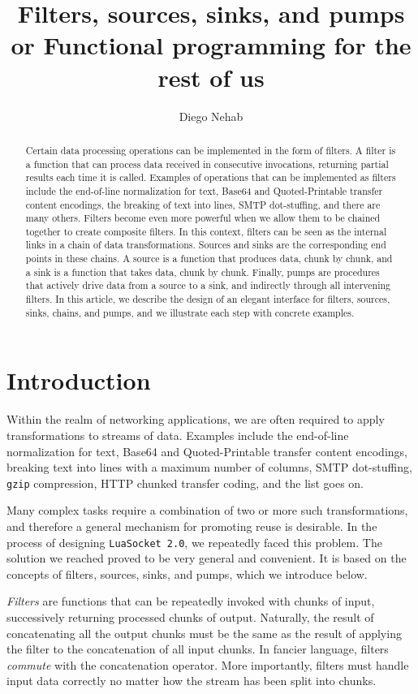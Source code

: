 \documentclass[10pt]{article}
\title{Filters, sources, sinks, and pumps\\
      {\large or Functional programming for the rest of us}}
\author{Diego Nehab}
\begin{document}
\maketitle

\begin{abstract}
Certain data processing operations can be implemented in the
form of filters. A filter is a function that can process
data received in consecutive invocations, returning partial
results each time it is called.  Examples of operations that
can be implemented as filters include the end-of-line
normalization for text, Base64 and Quoted-Printable transfer
content encodings, the breaking of text into lines, SMTP
dot-stuffing, and there are many others.  Filters become
even more powerful when we allow them to be chained together
to create composite filters. In this context, filters can be
seen as the internal links in a chain of data transformations.
Sources and sinks are the corresponding end points in these
chains. A source is a function that produces data, chunk by
chunk, and a sink is a function that takes data, chunk by
chunk. Finally, pumps are procedures that actively drive
data from a source to a sink, and indirectly through all 
intervening filters.  In this article, we describe the design of an
elegant interface for filters, sources, sinks, chains, and
pumps, and we illustrate each step with concrete examples. 
\end{abstract}

\section{Introduction}

Within the realm of networking applications, we are often
required to apply transformations to streams of data. Examples
include the end-of-line normalization for text, Base64 and
Quoted-Printable transfer content encodings, breaking text
into lines with a maximum number of columns, SMTP
dot-stuffing, \texttt{gzip} compression, HTTP chunked
transfer coding, and the list goes on.

Many complex tasks require a combination of two or more such
transformations, and therefore a general mechanism for
promoting reuse is desirable. In the process of designing
\texttt{LuaSocket~2.0}, we repeatedly faced this problem.
The solution we reached proved to be very general and
convenient. It is based on the concepts of filters, sources,
sinks, and pumps, which we introduce below. 

\emph{Filters} are functions that can be repeatedly invoked
with chunks of input, successively returning processed
chunks of output. Naturally, the result of
concatenating all the output chunks must be the same as the
result of applying the filter to the concatenation of all
input chunks. In fancier language, filters \emph{commute}
with the concatenation operator. More importantly, filters
must handle input data correctly no matter how the stream
has been split into chunks. 
\end{document}
